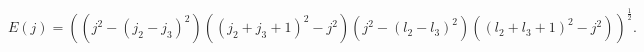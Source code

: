 \[E(j)=\left((j^{2}-(j_{2}-j_{3})^{2})((j_{2}+j_{3}+1)^{2}-j^{2})(j^{2}-(l_{2}-l%
_{3})^{2})((l_{2}+l_{3}+1)^{2}-j^{2})\right)^{\frac{1}{2}}.\]